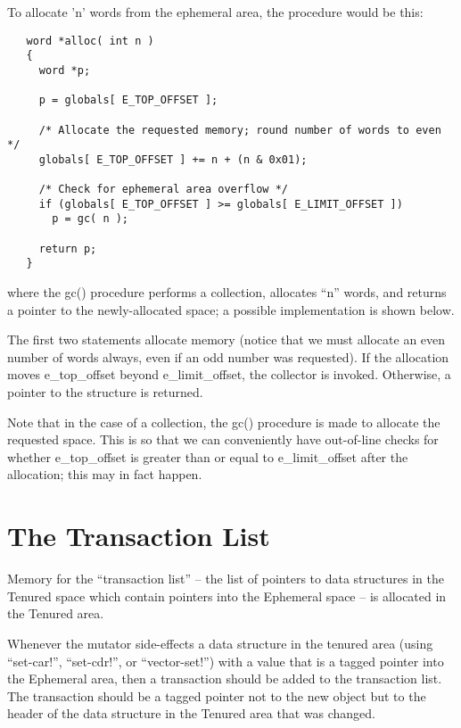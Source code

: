 To allocate 'n' words from the ephemeral area, the procedure would be this:

\begin{minipage}{\linewidth}
\begin{verbatim}
   word *alloc( int n )
   {
     word *p;

     p = globals[ E_TOP_OFFSET ];

     /* Allocate the requested memory; round number of words to even */
     globals[ E_TOP_OFFSET ] += n + (n & 0x01);

     /* Check for ephemeral area overflow */
     if (globals[ E_TOP_OFFSET ] >= globals[ E_LIMIT_OFFSET ]) 
       p = gc( n );

     return p;
   }
\end{verbatim}
\end{minipage}

where the gc() procedure performs a collection, allocates ``n'' words, and
returns a pointer to the newly-allocated space; a possible implementation
is shown below.

The first two statements allocate memory (notice that we must allocate
an even number of words always, even if an odd number was requested).
If the allocation moves {\sc e\_top\_offset} beyond {\sc
e\_limit\_offset}, the collector is invoked.  Otherwise, a pointer to
the structure is returned.

Note that in the case of a collection, the gc() procedure is made to
allocate the requested space. This is so that we can conveniently have
out-of-line checks for whether {\sc e\_top\_offset} is greater than or
equal to {\sc e\_limit\_offset} after the allocation; this may in fact
happen.


\section{The Transaction List}

Memory for the ``transaction list'' -- the list of pointers to data
structures in the Tenured space which contain pointers into the Ephemeral
space -- is allocated in the Tenured area.

Whenever the mutator side-effects a data structure in the tenured area
(using ``set-car!'', ``set-cdr!'', or ``vector-set!'') with a value that is
a tagged pointer into the Ephemeral area, then a transaction should be
added to the transaction list. The transaction should be a tagged pointer
not to the new object but to the header of the data structure in the
Tenured area that was changed.

